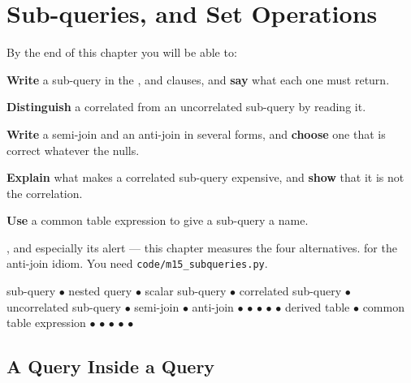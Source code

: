 \chapter{Sub-queries, \texorpdfstring{}{EXISTS} and Set Operations}\label{ch:subqueries}

\begin{outcomes}
By the end of this chapter you will be able to:
\begin{tight}
  \item \textbf{Write} a sub-query in the ,  and
         clauses, and \textbf{say} what each one must return.
  \item \textbf{Distinguish} a correlated from an uncorrelated sub-query by
        reading it.
  \item \textbf{Write} a semi-join and an anti-join in several forms, and
        \textbf{choose} one that is correct whatever the nulls.
  \item \textbf{Explain} what makes a correlated sub-query expensive, and
        \textbf{show} that it is not the correlation.
  \item \textbf{Use} a common table expression to give a sub-query a name.
\end{tight}
\end{outcomes}

\begin{prereq}
, and especially its  alert --- this chapter
measures the four alternatives.  for the anti-join idiom. You
need \texttt{code/m15\_subqueries.py}.
\end{prereq}

\begin{keyterms}
sub-query $\bullet$ nested query $\bullet$ scalar sub-query $\bullet$
correlated sub-query $\bullet$ uncorrelated sub-query $\bullet$ semi-join
$\bullet$ anti-join $\bullet$  $\bullet$  $\bullet$
 $\bullet$  $\bullet$ derived table $\bullet$ common
table expression $\bullet$  $\bullet$  $\bullet$
 $\bullet$  $\bullet$ 
\end{keyterms}

\section{A Query Inside a Query}

